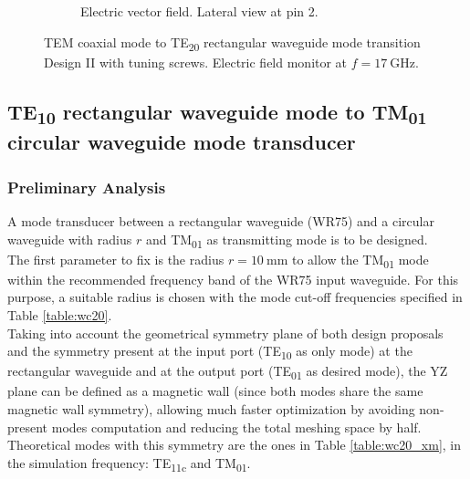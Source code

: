 \documentclass[english,twoside]{article}
\begin{document}
\begin{landscape}
\begin{figure}
\begin{subfigure}[b]{0.45\textwidth}
					\caption{Electric vector field. Lateral view at pin 2.}
				\end{subfigure}
				\caption{TEM coaxial mode to TE\textsubscript{20} rectangular waveguide mode transition Design II with tuning screws. Electric field monitor at $f=\SI{17}{\giga\hertz}$.}
			\end{figure}
		\end{landscape}
	
	\newpage
	\subsection{TE\textsubscript{10} rectangular waveguide mode to TM\textsubscript{01} circular waveguide mode transducer}
	\subsubsection{Preliminary Analysis}
		A mode transducer between a rectangular waveguide (\ac{WR}75) and a circular waveguide with radius $r$ and \ac{TM}\textsubscript{01} as transmitting mode is to be designed.\\
		
		The first parameter to fix is the radius $r=\SI{10}{\milli\metre}$ to allow the TM\textsubscript{01} mode within the recommended frequency band of the \ac{WR}75 input waveguide. For this purpose, a suitable radius is chosen with the mode cut-off frequencies specified in Table \ref{table:wc20}.\\
				
		Taking into account the geometrical symmetry plane of both design proposals and the symmetry present at the input port (\ac{TE}\textsubscript{10} as only mode) at the rectangular waveguide and at the output port (\ac{TE}\textsubscript{01} as desired mode), the YZ plane can be defined as a magnetic wall (since both modes share the same magnetic wall symmetry), allowing much faster optimization by avoiding non-present modes computation and reducing the total meshing space by half. Theoretical modes with this symmetry are the ones in Table \ref{table:wc20_xm}, in the simulation frequency: \ac{TE}\textsubscript{11c} and \ac{TM}\textsubscript{01}.
		
\end{document}

